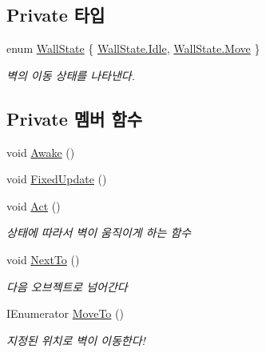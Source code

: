 \subsection*{Private 타입}
\begin{DoxyCompactItemize}
\item 
enum \mbox{\hyperlink{class_moving_platform_ac47e764b71989317aab0bad26d82a901}{Wall\+State}} \{ \mbox{\hyperlink{class_moving_platform_ac47e764b71989317aab0bad26d82a901ae599161956d626eda4cb0a5ffb85271c}{Wall\+State.\+Idle}}, 
\mbox{\hyperlink{class_moving_platform_ac47e764b71989317aab0bad26d82a901a6bc362dbf494c61ea117fe3c71ca48a5}{Wall\+State.\+Move}}
 \}
\begin{DoxyCompactList}\small\item\em 벽의 이동 상태를 나타낸다. \end{DoxyCompactList}\end{DoxyCompactItemize}
\subsection*{Private 멤버 함수}
\begin{DoxyCompactItemize}
\item 
void \mbox{\hyperlink{class_moving_platform_aec6412bf79a5d4fdec57da2e3b390b93}{Awake}} ()
\item 
void \mbox{\hyperlink{class_moving_platform_a935710333a3a0f0164dad887e8eb7d1c}{Fixed\+Update}} ()
\item 
void \mbox{\hyperlink{class_moving_platform_ab4a3f15333f41ba4a3b9bc0227777460}{Act}} ()
\begin{DoxyCompactList}\small\item\em 상태에 따라서 벽이 움직이게 하는 함수 \end{DoxyCompactList}\item 
void \mbox{\hyperlink{class_moving_platform_a35d0362f80c6b673f2b544a6db8c79b7}{Next\+To}} ()
\begin{DoxyCompactList}\small\item\em 다음 오브젝트로 넘어간다 \end{DoxyCompactList}\item 
I\+Enumerator \mbox{\hyperlink{class_moving_platform_afb52616391e79cf7e015f5fb37d50e16}{Move\+To}} ()
\begin{DoxyCompactList}\small\item\em 지정된 위치로 벽이 이동한다! \end{DoxyCompactList}\end{DoxyCompactItemize}
